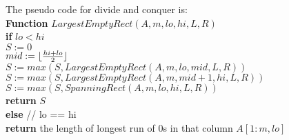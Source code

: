 \documentclass[11pt]{article}
\DeclarePairedDelimiter\floor{\lfloor}{\rfloor}
\begin{document}
The pseudo code for divide and conquer is:\\

\textbf{Function} $LargestEmptyRect(A,m,lo,hi,L,R)$\\
\-\hspace{2em} \textbf{if} $lo < hi$ \\
\-\hspace{4em} $S := 0$\\
\-\hspace{4em} $mid := \floor{\frac{hi+lo}{2}}$\\
\-\hspace{4em} $S := max(S, LargestEmptyRect(A,m,lo,mid,L,R))$\\
\-\hspace{4em} $S := max(S, LargestEmptyRect(A,m,mid+1,hi,L,R))$\\
\-\hspace{4em} $S := max(S, SpanningRect(A,m,lo,hi,L,R))$\\
\-\hspace{4em} \textbf{return} $S$\\
\-\hspace{2em} \textbf{else} // lo == hi\\
\-\hspace{4em} \textbf{return} the length of longest run of 0s in that
column $A[1:m, lo]$\\
\end{document}
